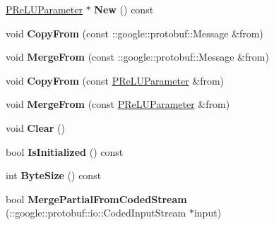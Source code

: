 \begin{DoxyCompactItemize}
\mbox{\hyperlink{classcaffe_1_1_p_re_l_u_parameter}{P\+Re\+L\+U\+Parameter}} $\ast$ {\bfseries New} () const
\item 
\mbox{\label{classcaffe_1_1_p_re_l_u_parameter_a3198ca4c9131fc3e86fed2a68cbbfd6e}} 
void {\bfseries Copy\+From} (const \+::google\+::protobuf\+::\+Message \&from)
\item 
\mbox{\label{classcaffe_1_1_p_re_l_u_parameter_aca91a34205670c6eb57e65669986b11b}} 
void {\bfseries Merge\+From} (const \+::google\+::protobuf\+::\+Message \&from)
\item 
\mbox{\label{classcaffe_1_1_p_re_l_u_parameter_a25406c9a358c8c38c1bb314b0f87ef7f}} 
void {\bfseries Copy\+From} (const \mbox{\hyperlink{classcaffe_1_1_p_re_l_u_parameter}{P\+Re\+L\+U\+Parameter}} \&from)
\item 
\mbox{\label{classcaffe_1_1_p_re_l_u_parameter_acf194cc62c7fc23d33230146bc8001ab}} 
void {\bfseries Merge\+From} (const \mbox{\hyperlink{classcaffe_1_1_p_re_l_u_parameter}{P\+Re\+L\+U\+Parameter}} \&from)
\item 
\mbox{\label{classcaffe_1_1_p_re_l_u_parameter_a1149d7ccf4c50625fdff41bc81bbba11}} 
void {\bfseries Clear} ()
\item 
\mbox{\label{classcaffe_1_1_p_re_l_u_parameter_a298a81f435533ee3dc9289d7053be5e0}} 
bool {\bfseries Is\+Initialized} () const
\item 
\mbox{\label{classcaffe_1_1_p_re_l_u_parameter_af9e4cfa819dc1515f8d68ed58bac6f59}} 
int {\bfseries Byte\+Size} () const
\item 
\mbox{\label{classcaffe_1_1_p_re_l_u_parameter_a66e87a72164698224c01e4053d5b2056}} 
bool {\bfseries Merge\+Partial\+From\+Coded\+Stream} (\+::google\+::protobuf\+::io\+::\+Coded\+Input\+Stream $\ast$input)
\item 
\mbox{\label{classcaffe_1_1_p_re_l_u_parameter_a9cc97d0c33344a2c720f955748d337bb}} 

\end{DoxyCompactItemize}

